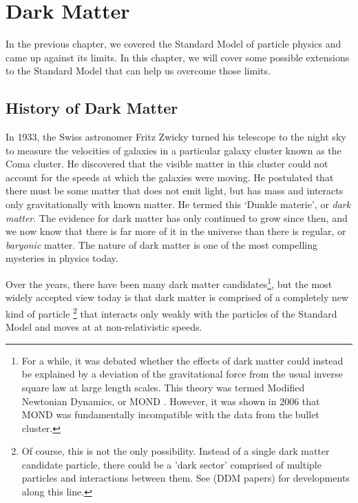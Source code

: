 \chapter{Dark Matter}\label{ch:bsm}

In the previous chapter, we covered the Standard Model of particle physics and came up against its limits. In this chapter, we will cover some possible extensions to the Standard Model that can help us overcome those limits.

\section{History of Dark Matter}\label{subsec:history-of-dark-matter}

In 1933, the Swiss astronomer Fritz Zwicky turned his telescope to the night sky to measure the velocities of galaxies in a particular galaxy cluster known as the Coma cluster. He discovered that the visible matter in this cluster could not account for the speeds at which the galaxies were moving. He postulated that there must be some matter that does not emit light, but has mass and interacts only gravitationally with known matter. He termed this `Dunkle materie', or \emph{dark matter}. The evidence for dark matter has only continued to grow since then, and we now know that there is far more of it in the universe than there is regular, or \emph{baryonic} matter. The nature of dark matter is one of the most compelling mysteries in physics today.

Over the years, there have been many dark matter candidates\footnote{For a while, it was debated whether the effects of dark matter could instead be explained by a deviation of the gravitational force from the usual inverse square law at large length scales. This theory was termed Modified Newtonian Dynamics, or MOND \citep{Milgrom1983}. However, it was shown in 2006 \citep{Clowe2006} that MOND was fundamentally incompatible with the data from the bullet cluster.}, but the most widely accepted view today is that dark matter is comprised of a completely new kind of particle \footnote{Of course, this is not the only possibility. Instead of a single dark matter candidate particle, there could be a 'dark sector' comprised of multiple particles and interactions between them. See (DDM papers) for developments along this line.} that interacts only weakly with the particles of the Standard Model and moves at at non-relativistic speeds.

